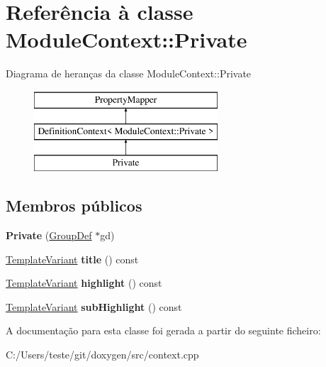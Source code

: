 \hypertarget{class_module_context_1_1_private}{\section{Referência à classe Module\-Context\-:\-:Private}
\label{class_module_context_1_1_private}
}
Diagrama de heranças da classe Module\-Context\-:\-:Private\begin{figure}[H]
\begin{center}
\leavevmode
\includegraphics[height=3.000000cm]{class_module_context_1_1_private}
\end{center}
\end{figure}
\subsection*{Membros públicos}
\begin{DoxyCompactItemize}
\item 
\hypertarget{class_module_context_1_1_private_a1fdeacdc54c86ef95bc37346c3bb4c18}{{\bfseries Private} (\hyperlink{class_group_def}{Group\-Def} $\ast$gd)}\label{class_module_context_1_1_private_a1fdeacdc54c86ef95bc37346c3bb4c18}

\item 
\hypertarget{class_module_context_1_1_private_a5732df72750a31555da8a10f5788ef02}{\hyperlink{class_template_variant}{Template\-Variant} {\bfseries title} () const }\label{class_module_context_1_1_private_a5732df72750a31555da8a10f5788ef02}

\item 
\hypertarget{class_module_context_1_1_private_ab088f4d955499ca1d67c286a117e5bfe}{\hyperlink{class_template_variant}{Template\-Variant} {\bfseries highlight} () const }\label{class_module_context_1_1_private_ab088f4d955499ca1d67c286a117e5bfe}

\item 
\hypertarget{class_module_context_1_1_private_a07fdcdf7a4c2a31c3ca0c5ffea8b6a9e}{\hyperlink{class_template_variant}{Template\-Variant} {\bfseries sub\-Highlight} () const }\label{class_module_context_1_1_private_a07fdcdf7a4c2a31c3ca0c5ffea8b6a9e}

\end{DoxyCompactItemize}


A documentação para esta classe foi gerada a partir do seguinte ficheiro\-:\begin{DoxyCompactItemize}
\item 
C\-:/\-Users/teste/git/doxygen/src/context.\-cpp\end{DoxyCompactItemize}
